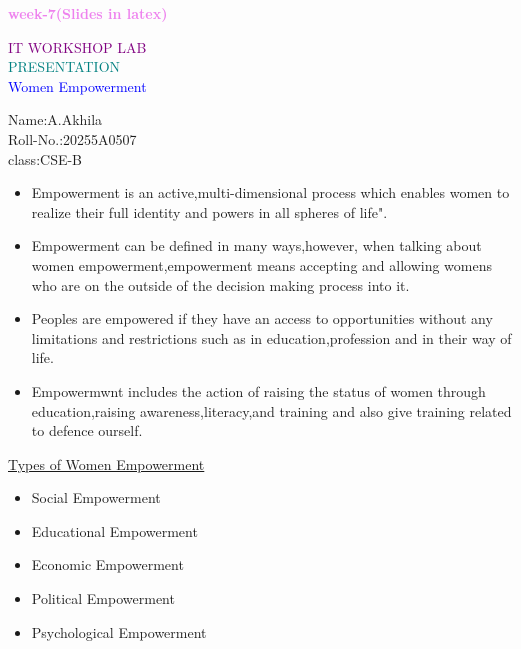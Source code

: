 \documentclass[landscape]{slides}
\begin{document}
\begin{slide}
\begin{center}
\textcolor{violet}{\huge \textbf{week-7(Slides in latex)}}\\
\end{center}
\begin{center}
\textcolor{purple}{\tiny IT WORKSHOP LAB}\\
\textcolor{teal}{\tiny PRESENTATION}\\
\textcolor{blue}{\tiny Women Empowerment}\\
\end{center}
\begin{flushleft}
\scriptsize Name:A.Akhila\\
\scriptsize Roll-No.:20255A0507\\
\scriptsize class:CSE-B\\
\end{flushleft}
\end{slide}
\begin{slide}
\begin{itemize}
\item \tiny Empowerment is an active,multi-dimensional process which enables women to realize their full identity and powers in all spheres of life".
\item \tiny Empowerment can be defined in many ways,however, when talking about women empowerment,empowerment means accepting and allowing womens who are on the outside of the decision making process into it.
\item \tiny Peoples are empowered if they have an access to opportunities without any limitations and restrictions such as in education,profession and in their way of life.
\item \tiny Empowermwnt includes the action of raising the status of women through education,raising awareness,literacy,and training and also give training related to defence ourself.
\end{itemize}
\end{slide}
\begin{slide}
\underline{\large Types of Women Empowerment}
\begin{itemize}
\item \tiny Social Empowerment
\item \tiny Educational Empowerment
\item \tiny Economic Empowerment
\item \tiny Political Empowerment
\item \tiny Psychological Empowerment
\end{itemize}
\end{slide}
\end{document}
